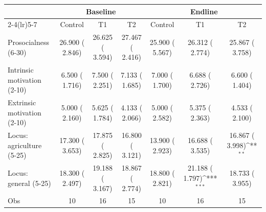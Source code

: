 \def\sym#1{\ifmmode^{#1}\else\(^{#1}\)\fi}
\begin{tabular}{lcccccc}
\toprule
 & \multicolumn{3}{c}{Baseline} & \multicolumn{3}{c}{Endline} \\
\cmidrule(lr){2-4}\cmidrule(lr){5-7}
 & Control & T1 & T2 & Control & T1 & T2 \\
\midrule
Prosocialness (6-30) &    26.900 (    2.846) &    26.625 (    3.594) &    27.467 (    2.416) &    25.900 (    5.567) &    26.312 (    2.774) &    25.867 (    3.758) \\
Intrinsic motivation (2-10) &     6.500 (    1.716) &     7.500 (    2.251) &     7.133 (    1.685) &     7.000 (    1.700) &     6.688 (    2.726) &     6.600 (    1.404) \\
Extrinsic motivation (2-10) &     5.000 (    2.160) &     5.625 (    1.784) &     4.133 (    2.066) &     5.000 (    2.582) &     5.375 (    2.363) &     4.533 (    2.100) \\
Locus: agriculture (5-25) &    17.300 (    3.653) &    17.875 (    2.825) &    16.800 (    3.121) &    13.900 (    2.923) &    16.688 (    3.535) &    16.867 (    3.998)\sym{**} \\
Locus: general (5-25) &    18.300 (    2.497) &    19.188 (    3.167) &    18.867 (    2.774) &    18.800 (    2.821) &    21.188 (    1.797)\sym{***} &    18.733 (    3.955) \\
\midrule
Obs &        10 &        16 &        15 &        10 &        16 &        15 \\
\bottomrule
\end{tabular}
